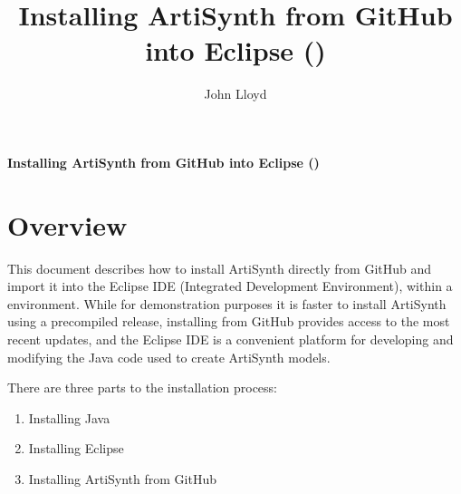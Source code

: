 \usepackage{enumitem}

\iflatexml
\else
\fancyhead[L,C,R]{}
\fancyfoot[L,R]{}
\fancyfoot[C]{\thepage}
\renewcommand{\headrulewidth}{0pt}
\renewcommand{\footrulewidth}{0pt}
\fi

\def\ArtHome[#1]{{\tt <ARTISYNTH\_HOME>#1}}

\title{Installing ArtiSynth from GitHub into Eclipse (\SYSTEM{})}
\author{John Lloyd}
\iflatexml
\date{}
\fi

\newif\ifNeedLibraryPath
\NeedLibraryPathfalse




\iflatexml{\large\pubdate}\fi


\iflatexml\else
\begin{center}
{\sffamily\Large\bfseries 
Installing ArtiSynth from GitHub into Eclipse (\SYSTEM{})}
\end{center}
\bigskip
\fi

\section{Overview}

This document describes how to install ArtiSynth directly from GitHub
and import it into the Eclipse IDE (Integrated Development
Environment), within a \SYSTEM{} environment. While for demonstration
purposes it is faster to install ArtiSynth using a precompiled
release, installing from GitHub provides access to the most recent
updates, and the Eclipse IDE is a convenient platform for developing
and modifying the Java code used to create ArtiSynth models.

There are three parts to the installation process:

\begin{enumerate}

\item Installing Java

\item Installing Eclipse

\item Installing ArtiSynth from GitHub

\end{enumerate}

